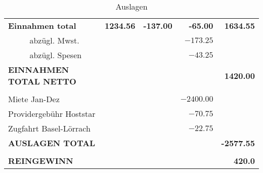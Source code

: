 \documentclass[10pt,a4paper]{article}
\begin{document}
\begin{small}
\begin{longtable}{ll p{} rrrr}
\\

\multicolumn{3}{l}{\textbf{Einnahmen total}} 
&\textbf{1234.56}
&\textbf{-137.00}
&\textbf{-65.00}
&\textbf{1634.55} \\
%
&&abzügl. Mwst.&&&{$-173.25$} \\
&&abzügl. Spesen&&&{$-43.25$} \\
\multicolumn{3}{l}{\textbf{EINNAHMEN TOTAL NETTO}}&&&&\textbf{1420.00} \\
%
%
\caption{Auslagen} \\
\multicolumn{3}{l}{Miete Jan-Dez} &&& {$-2400.00$} \\
\multicolumn{3}{l}{Providergebühr Hoststar}&&&{$-70.75$}\\
\multicolumn{3}{l}{Zugfahrt Basel-Lörrach}&&&{$-22.75$}\\
\multicolumn{3}{l}{\textbf{AUSLAGEN TOTAL}} &&&&
\textbf{-2577.55}\\
\\
\multicolumn{3}{l}{\textbf{REINGEWINN}} &&&&
 \textbf{420.0} \\
 
\end{longtable}
\end{small}
\end{document}
